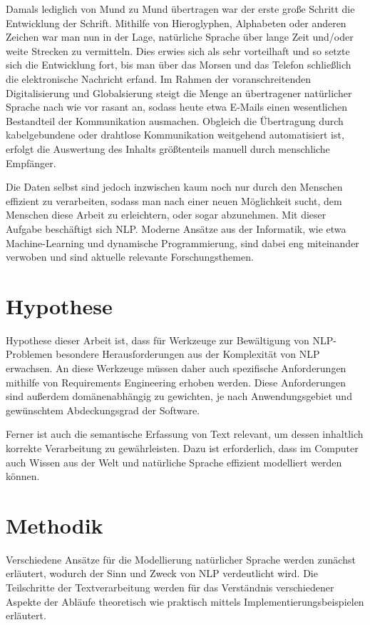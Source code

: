 \documentclass[12pt]{report}
\begin{document}
Damals lediglich von Mund zu Mund übertragen war der erste große Schritt die Entwicklung der Schrift. Mithilfe von Hieroglyphen, Alphabeten oder anderen Zeichen war man nun in der Lage, natürliche Sprache über lange Zeit und/oder weite Strecken zu vermitteln. Dies erwies sich als sehr vorteilhaft und so setzte sich die Entwicklung fort, bis man über das Morsen und das Telefon schließlich die elektronische Nachricht erfand. 
Im Rahmen der voranschreitenden Digitalisierung und Globalsierung steigt die Menge an übertragener natürlicher Sprache nach wie vor rasant an, sodass heute etwa E-Mails einen wesentlichen Bestandteil der Kommunikation ausmachen. Obgleich die Übertragung durch kabelgebundene oder drahtlose Kommunikation weitgehend automatisiert ist, erfolgt die Auswertung des Inhalts größtenteils manuell durch menschliche Empfänger.

Die Daten selbst sind jedoch inzwischen kaum noch nur durch den Menschen effizient zu verarbeiten, sodass man nach einer neuen Möglichkeit sucht, dem Menschen diese Arbeit zu erleichtern, oder sogar abzunehmen. Mit dieser Aufgabe beschäftigt sich NLP. Moderne Ansätze aus der Informatik, wie etwa Machine-Learning und dynamische Programmierung, sind dabei eng miteinander verwoben und sind aktuelle relevante Forschungsthemen.

\section{Hypothese}
Hypothese dieser Arbeit ist, dass für Werkzeuge zur Bewältigung von NLP-Problemen besondere Herausforderungen aus der Komplexität von NLP erwachsen. An diese Werkzeuge müssen daher auch spezifische Anforderungen mithilfe von Requirements Engineering erhoben werden. Diese Anforderungen sind außerdem domänenabhängig zu gewichten, je nach Anwendungsgebiet und gewünschtem Abdeckungsgrad der Software.

Ferner ist auch die semantische Erfassung von Text relevant, um dessen inhaltlich korrekte Verarbeitung zu gewährleisten. Dazu ist erforderlich, dass im Computer auch Wissen aus der Welt und natürliche Sprache effizient modelliert werden können.

\section{Methodik}
Verschiedene Ansätze für die Modellierung natürlicher Sprache werden zunächst erläutert, wodurch der Sinn und Zweck von NLP verdeutlicht wird. Die Teilschritte der Textverarbeitung werden für das Verständnis verschiedener Aspekte der Abläufe theoretisch wie praktisch mittels Implementierungsbeispielen erläutert.
\end{document}
